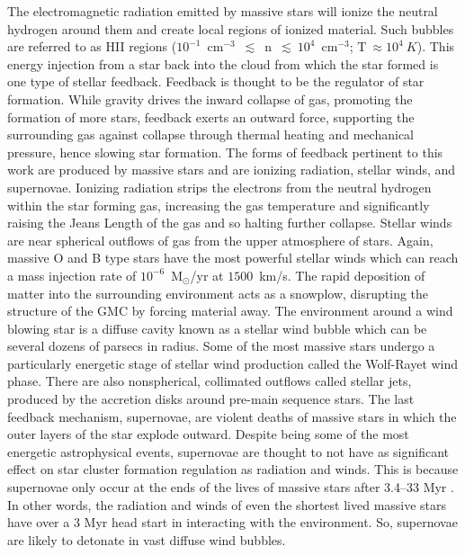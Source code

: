 \documentclass[twoside]{drexel-thesis}
\begin{document}
\begin{thesis}
The electromagnetic radiation emitted by massive stars will ionize the neutral hydrogen around them and create local regions of ionized material. Such bubbles are referred to as HII regions ($10^{-1}$~cm$^{-3}$~$\lesssim$~n~$\lesssim~10^{4}$~cm$^{-3}$; T$~\approx{10^{4}~K}$). This energy injection from a star back into the cloud from which the star formed is one type of stellar feedback. Feedback is thought to be the regulator of star formation. While gravity drives the inward collapse of gas, promoting the formation of more stars, feedback exerts an outward force, supporting the surrounding gas against collapse through thermal heating and mechanical pressure, hence slowing star formation. The forms of feedback pertinent to this work are produced by massive stars and are ionizing radiation, stellar winds, and supernovae. Ionizing radiation strips the electrons from the neutral hydrogen within the star forming gas, increasing the gas temperature and significantly raising the Jeans Length of the gas and so halting further collapse. Stellar winds are near spherical outflows of gas from the upper atmosphere of stars. Again, massive O and B type stars have the most powerful stellar winds which can reach a mass injection rate of $10^{-6}$~M$_\odot$/yr at $1500$~km/s. The rapid deposition of matter into the surrounding environment acts as a snowplow, disrupting the structure of the GMC by forcing material away. The environment around a wind blowing star is a diffuse cavity known as a stellar wind bubble which can be several dozens of parsecs in radius. Some of the most massive stars undergo a particularly energetic stage of stellar wind production called the Wolf-Rayet wind phase. There are also nonspherical, collimated outflows called stellar jets, produced by the accretion disks around pre-main sequence stars.  The last feedback mechanism, supernovae, are violent deaths of massive stars in which the outer layers of the star explode outward. Despite being some of the most energetic astrophysical events, supernovae are thought to not have as significant effect on star cluster formation regulation as radiation and winds. This is because supernovae only occur at the ends of the lives of massive stars after 3.4--33 Myr \citep{stahler_palla_2004}. In other words, the radiation and winds of even the shortest lived massive stars have over a 3 Myr head start in interacting with the environment. So, supernovae are likely to detonate in vast diffuse wind bubbles.


\end{thesis}
\end{document}
